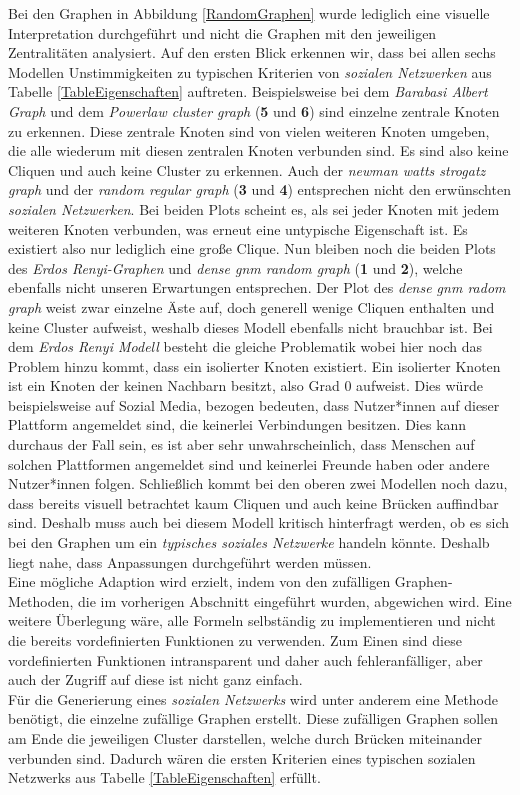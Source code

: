Bei den Graphen in Abbildung \ref{RandomGraphen} wurde lediglich eine visuelle Interpretation durchgeführt und nicht die Graphen mit den jeweiligen Zentralitäten analysiert. Auf den ersten Blick erkennen wir, dass bei allen sechs Modellen Unstimmigkeiten zu typischen Kriterien von \textit{sozialen Netzwerken} aus Tabelle \ref{TableEigenschaften} auftreten. Beispielsweise bei dem \textit{Barabasi Albert Graph} und dem \textit{Powerlaw cluster graph} (\textbf{5} und \textbf{6}) sind einzelne zentrale Knoten zu erkennen. Diese zentrale Knoten sind von vielen weiteren Knoten umgeben, die alle wiederum mit diesen zentralen Knoten verbunden sind. Es sind also keine Cliquen und auch keine Cluster zu erkennen. Auch der \textit{newman watts strogatz graph} und der \textit{random regular graph} (\textbf{3} und \textbf{4}) entsprechen nicht den erwünschten \textit{sozialen Netzwerken}. Bei beiden Plots scheint es, als sei jeder Knoten mit jedem weiteren Knoten verbunden, was erneut eine untypische Eigenschaft ist. Es existiert also nur lediglich eine große Clique. Nun bleiben noch die beiden Plots des \textit{Erdos Renyi-Graphen} und \textit{dense gnm random graph} (\textbf{1} und \textbf{2}), welche ebenfalls nicht unseren Erwartungen entsprechen. Der Plot des \textit{dense gnm radom graph} weist zwar einzelne Äste auf, doch generell wenige Cliquen enthalten und keine Cluster aufweist, weshalb dieses Modell ebenfalls nicht brauchbar ist. Bei dem \textit{Erdos Renyi Modell} besteht die gleiche Problematik wobei hier noch das Problem hinzu kommt, dass ein isolierter Knoten existiert. Ein isolierter Knoten ist ein Knoten der keinen Nachbarn besitzt, also Grad $0$ aufweist.
Dies würde beispielsweise auf Sozial Media, bezogen bedeuten, dass Nutzer*innen auf dieser Plattform angemeldet sind, die keinerlei Verbindungen besitzen. Dies kann durchaus der Fall sein, es ist aber sehr unwahrscheinlich, dass Menschen auf solchen Plattformen angemeldet sind und keinerlei Freunde haben oder andere Nutzer*innen folgen.
\newpage
Schließlich kommt bei den oberen zwei Modellen noch dazu, dass bereits visuell betrachtet kaum Cliquen und auch keine Brücken auffindbar sind. Deshalb muss auch bei diesem Modell kritisch hinterfragt werden, ob es sich bei den Graphen um ein \textit{typisches soziales Netzwerke} handeln könnte. Deshalb liegt nahe, dass Anpassungen durchgeführt werden müssen.\\


Eine mögliche Adaption wird erzielt, indem von den zufälligen Graphen-Methoden, die im vorherigen Abschnitt eingeführt wurden, abgewichen wird. Eine weitere Überlegung wäre, alle Formeln selbständig zu implementieren und nicht die bereits vordefinierten Funktionen zu verwenden. Zum Einen sind diese vordefinierten Funktionen intransparent und daher auch fehleranfälliger, aber auch der Zugriff auf diese ist nicht ganz einfach. \\
Für die Generierung eines \textit{sozialen Netzwerks} wird unter anderem eine Methode benötigt, die einzelne zufällige Graphen erstellt. Diese zufälligen Graphen sollen am Ende die jeweiligen Cluster darstellen, welche durch Brücken miteinander verbunden sind. Dadurch wären die ersten Kriterien eines typischen sozialen Netzwerks aus Tabelle \ref{TableEigenschaften} erfüllt.

